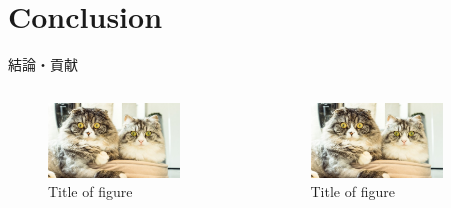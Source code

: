 \documentclass[12pt,xcolor=dvipsnames,table,dvipdfmx]{beamer}
\theoremstyle{definition}
\theoremstyle{definition}
\begin{document}
\section{Conclusion}
\begin{frame}{結論・貢献}
    \begin{columns}[t]
        \begin{column}{0.5\textwidth} %
            \begin{figure}[htb]
              \centering
              \includegraphics[width=3.5cm,clip]{assets/fig1.eps}
              \caption{Title of figure}
            \end{figure}%
        \end{column}
        \begin{column}{0.5\textwidth}
            \begin{figure}[htb]
              \centering
              \includegraphics[width=3.5cm,clip]{assets/fig1.eps}
              \caption{Title of figure}
            \end{figure}%
        \end{column}
    \end{columns}
\end{frame}
\end{document}
